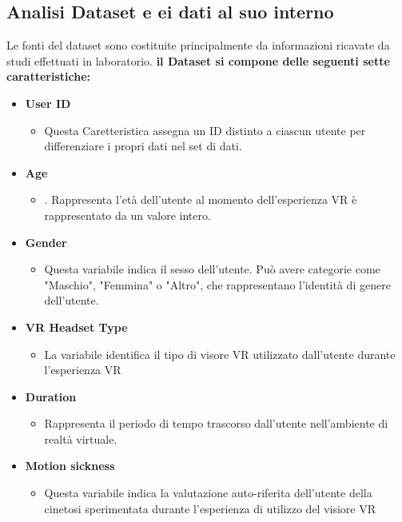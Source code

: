 \subsection{Analisi Dataset e ei dati al suo interno}
\fancyhead{}    %
\label{paragrafo 2.2}
\par{
Le fonti del dataset sono costituite principalmente da informazioni ricavate da studi effettuati in laboratorio.
\textbf{il Dataset si compone delle seguenti sette caratteristiche:}\newline
\begin{itemize}
  \item \textbf{User ID}
    \begin{itemize}
      \item Questa Caretteristica assegna un ID distinto a ciascun utente per differenziare i propri dati nel set di dati.
    \end{itemize}
  \item \textbf{Age}
    \begin{itemize}
      \item . Rappresenta l'età dell'utente al momento dell'esperienza VR è rappresentato da un valore intero.
    \end{itemize}
  \item \textbf{Gender}
    \begin{itemize}
      \item Questa variabile indica il sesso dell'utente. Può avere categorie come "Maschio", "Femmina" o "Altro", che rappresentano l'identità di genere dell'utente.
    \end{itemize}
  \item \textbf{VR Headset Type}
    \begin{itemize}
      \item La variabile identifica il tipo di visore VR utilizzato dall'utente durante l'esperienza VR
    \end{itemize}
  \item \textbf{Duration}
    \begin{itemize}
      \item Rappresenta il periodo di tempo trascorso dall'utente nell'ambiente di realtà virtuale.
    \end{itemize}
  \item \textbf{Motion sickness}
    \begin{itemize}
      \item Questa variabile indica la valutazione auto-riferita dell'utente della cinetosi sperimentata durante l’esperienza di utilizzo del visiore VR

\end{itemize}
\end{itemize}}
